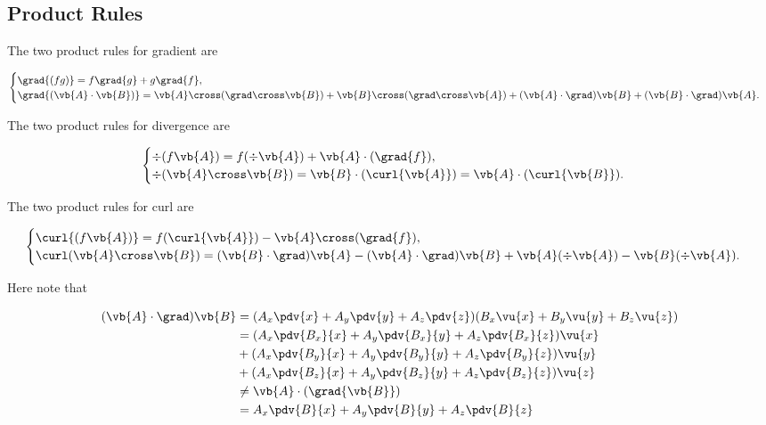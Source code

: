 \documentclass[english,a4paper,12pt]{report}
\begin{document}
\subsection{Product Rules}
The two product rules for gradient are

\begin{equation}
\begin{cases} 
	\grad{(fg)} = f\grad{g} + g\grad{f},  \\
	\grad{(\vb{A} \cdot \vb{B})} = \vb{A} \cross (\grad \cross \vb{B}) + \vb{B} \cross (\grad \cross \vb{A}) + (\vb{A} \cdot \grad)\vb{B} + (\vb{B} \cdot \grad)\vb{A}. 
\end{cases}
\end{equation}
	
The two product rules for divergence are 

\begin{equation}
\begin{cases} 
	\div{(f\vb{A})} = f(\div{\vb{A}}) + \vb{A} \cdot (\grad{f}), \\
	\div (\vb{A} \cross \vb{B}) = \vb{B} \cdot (\curl {\vb{A}}) = \vb{A} \cdot (\curl{\vb{B}}). 
\end{cases}
\end{equation}

	
The two product rules for curl are
	
\begin{equation}
\begin{cases} 
	\curl{(f\vb{A})} = f(\curl{\vb{A}}) - \vb{A} \cross (\grad{f}), \\
	\curl (\vb{A} \cross \vb{B}) = (\vb{B} \cdot \grad)\vb{A} - (\vb{A} \cdot \grad)\vb{B} + \vb{A}(\div{\vb{A}}) - \vb{B}(\div{\vb{A}}). 
\end{cases}
\end{equation}

	
Here note that

\begin{equation} 
	\begin{aligned} 
		(\vb{A} \cdot \grad) \vb{B} &= (A_x\pdv{x} + A_y\pdv{y} + A_z\pdv{z})(B_x\vu{x} + B_y\vu{y} + B_z\vu{z}) \\ &= (A_x\pdv{B_x}{x} + A_y\pdv{B_x}{y} + A_z\pdv{B_x}{z})\vu{x} \\ &+ (A_x\pdv{B_y}{x} + A_y\pdv{B_y}{y} + A_z\pdv{B_y}{z})\vu{y} \\ &+ (A_x\pdv{B_z}{x} + A_y\pdv{B_z}{y} + A_z\pdv{B_z}{z})\vu{z} \\ &\neq \vb{A} \cdot (\grad{\vb{B}}) \\ &= A_x\pdv{B}{x} + A_y\pdv{B}{y} + A_z\pdv{B}{z} 
	\end{aligned} 
\end{equation}
	
\end{document}
